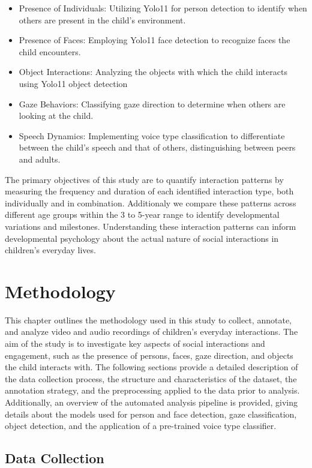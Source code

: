 \documentclass[
  man,floatsintext]{apa6}
\providecommand{\tightlist}{%
  \setlength{\itemsep}{0pt}\setlength{\parskip}{0pt}}
\begin{document}
\begin{itemize}
\tightlist
\item
  Presence of Individuals: Utilizing Yolo11 for person detection to identify when others are present in the child's environment.
\item
  Presence of Faces: Employing Yolo11 face detection to recognize faces the child encounters.
\item
  Object Interactions: Analyzing the objects with which the child interacts using Yolo11 object detection
\item
  Gaze Behaviors: Classifying gaze direction to determine when others are looking at the child.
\item
  Speech Dynamics: Implementing voice type classification to differentiate between the child's speech and that of others, distinguishing between peers and adults.
\end{itemize}

The primary objectives of this study are to quantify interaction patterns by measuring the frequency and duration of each identified interaction type, both individually and in combination. Additionaly we compare these patterns across different age groups within the 3 to 5-year range to identify developmental variations and milestones. Understanding these interaction patterns can inform developmental psychology about the actual nature of social interactions in children's everyday lives.

\section{Methodology}\label{methodology}

This chapter outlines the methodology used in this study to collect, annotate, and analyze video and audio recordings of children's everyday interactions. The aim of the study is to investigate key aspects of social interactions and engagement, such as the presence of persons, faces, gaze direction, and objects the child interacts with. The following sections provide a detailed description of the data collection process, the structure and characteristics of the dataset, the annotation strategy, and the preprocessing applied to the data prior to analysis. Additionally, an overview of the automated analysis pipeline is provided, giving details about the models used for person and face detection, gaze classification, object detection, and the application of a pre-trained voice type classifier.

\subsection{Data Collection}\label{data-collection}
\end{document}
